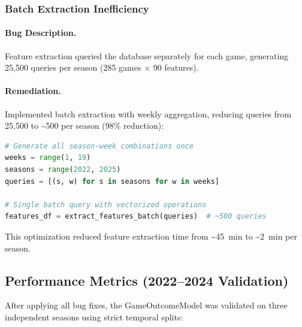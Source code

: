 \subsubsection{Batch Extraction Inefficiency}

\paragraph{Bug Description.}
Feature extraction queried the database separately for each game, generating 25,500 queries per season (285 games $\times$ 90 features).

\paragraph{Remediation.}
Implemented batch extraction with weekly aggregation, reducing queries from 25,500 to \SI{~500}{} per season (98\% reduction):

\begin{lstlisting}[language=Python,style=codestyle,caption={Batch Feature Extraction},label={lst:batch-extraction}]
# Generate all season-week combinations once
weeks = range(1, 19)
seasons = range(2022, 2025)
queries = [(s, w) for s in seasons for w in weeks]

# Single batch query with vectorized operations
features_df = extract_features_batch(queries)  # ~500 queries
\end{lstlisting}

This optimization reduced feature extraction time from \SI{~45}{min} to \SI{~2}{min} per season.

\subsection{Performance Metrics (2022--2024 Validation)}

After applying all bug fixes, the GameOutcomeModel was validated on three independent seasons using strict temporal splits:

